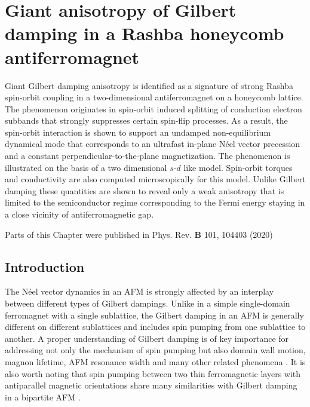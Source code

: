 \chapter{Giant anisotropy of Gilbert damping in a Rashba honeycomb antiferromagnet} \label{ch:baglay}%

Giant Gilbert damping anisotropy is identified as a signature of strong Rashba spin-orbit coupling in a two-dimensional antiferromagnet on a honeycomb lattice. The phenomenon originates in spin-orbit induced splitting of conduction electron subbands that strongly suppresses certain spin-flip processes. As a result, the spin-orbit interaction is shown to support an undamped non-equilibrium dynamical mode that corresponds to an ultrafast in-plane N\'eel vector precession and a constant perpendicular-to-the-plane magnetization. The phenomenon is illustrated on the basis of a two dimensional $s$-$d$ like model. Spin-orbit torques and conductivity are also computed microscopically for this model. Unlike Gilbert damping these quantities are shown to reveal only a weak anisotropy that is limited to the semiconductor regime corresponding to the Fermi energy staying in a close vicinity of antiferromagnetic gap.

\vfill
Parts of this Chapter were published in Phys. Rev. \textbf{B} 101, 104403 (2020)\clearpage

\section{Introduction}
The N\'eel vector dynamics in an AFM is strongly affected by an interplay between different types of Gilbert dampings. Unlike in a simple single-domain ferromagnet with a single sublattice, the Gilbert damping in an AFM is generally different on different sublattices and includes spin pumping from one sublattice to another. A proper understanding of Gilbert damping is of key importance for addressing not only the mechanism of spin pumping but also domain wall motion, magnon lifetime, AFM resonance width and many other related phenomena \cite{PhysRevMaterials.1.061401, Kamra2018, Mahfouzi2018a, Yuan_2019, hals_phenomenology_2011}. It is also worth noting that spin pumping between two thin ferromagnetic layers with antiparallel magnetic orientations share many similarities with Gilbert damping in a bipartite AFM \cite{Heinrich2003,Tserkovnyak}. 

